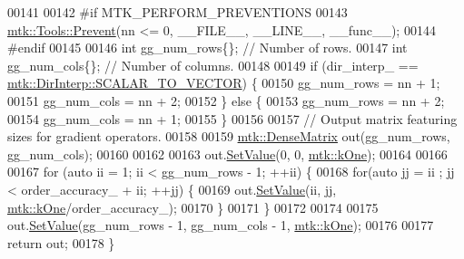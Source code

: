 \begin{DoxyCode}
00141 
00142 \textcolor{preprocessor}{  #if MTK\_PERFORM\_PREVENTIONS}
00143   \hyperlink{classmtk_1_1Tools_a332324c6f25e66be9dff48c5987a3b9f}{mtk::Tools::Prevent}(nn <= 0, \_\_FILE\_\_, \_\_LINE\_\_, \_\_func\_\_);
00144 \textcolor{preprocessor}{  #endif}
00145 
00146   \textcolor{keywordtype}{int} gg\_num\_rows\{\};  \textcolor{comment}{// Number of rows.}
00147   \textcolor{keywordtype}{int} gg\_num\_cols\{\};  \textcolor{comment}{// Number of columns.}
00148 
00149   \textcolor{keywordflow}{if} (dir\_interp\_ == \hyperlink{namespacemtk_ga674ec67bd1baa04e5dc06c2bcc351972a53facfbeb6725b2bd220c8d9811a0673}{mtk::DirInterp::SCALAR\_TO\_VECTOR}) \{
00150     gg\_num\_rows = nn + 1;
00151     gg\_num\_cols = nn + 2;
00152   \} \textcolor{keywordflow}{else} \{
00153     gg\_num\_rows = nn + 2;
00154     gg\_num\_cols = nn + 1;
00155   \}
00156 
00157   \textcolor{comment}{// Output matrix featuring sizes for gradient operators.}
00158 
00159   \hyperlink{classmtk_1_1DenseMatrix}{mtk::DenseMatrix} out(gg\_num\_rows, gg\_num\_cols);
00160 
00162 
00163   out.\hyperlink{classmtk_1_1DenseMatrix_a784ce5784109ac86bfb9d8562b334b13}{SetValue}(0, 0, \hyperlink{group__c01-roots_ga26407c24d43b6b95480943340d285c71}{mtk::kOne});
00164 
00166 
00167   \textcolor{keywordflow}{for} (\textcolor{keyword}{auto} ii = 1; ii < gg\_num\_rows - 1; ++ii) \{
00168     \textcolor{keywordflow}{for}(\textcolor{keyword}{auto} jj = ii ; jj < order\_accuracy\_ + ii; ++jj) \{
00169       out.\hyperlink{classmtk_1_1DenseMatrix_a784ce5784109ac86bfb9d8562b334b13}{SetValue}(ii, jj, \hyperlink{group__c01-roots_ga26407c24d43b6b95480943340d285c71}{mtk::kOne}/order\_accuracy\_);
00170     \}
00171   \}
00172 
00174 
00175   out.\hyperlink{classmtk_1_1DenseMatrix_a784ce5784109ac86bfb9d8562b334b13}{SetValue}(gg\_num\_rows - 1, gg\_num\_cols - 1, \hyperlink{group__c01-roots_ga26407c24d43b6b95480943340d285c71}{mtk::kOne});
00176 
00177   \textcolor{keywordflow}{return} out;
00178 \}
\end{DoxyCode}

